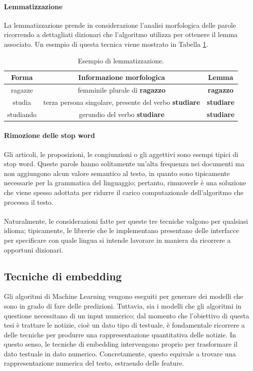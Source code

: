 \documentclass[12pt]{report}
\theoremstyle{definition}
\begin{document}
\paragraph{Lemmatizzazione} La lemmatizzazione prende in considerazione l'analisi morfologica delle parole ricorrendo a dettagliati dizionari che l'algoritmo utilizza per ottenere il lemma associato.
Un esempio di questa tecnica viene mostrato in Tabella \ref{lemmatization}.
\begin{table}[!h]
\centering
 \begin{tabular}{|c|c|c|} 
 \hline 
 \textbf{Forma} & \textbf{Informazione morfologica} & \textbf{Lemma}
\\ [0.5ex] 
\hline
ragazze & femminile plurale di \textbf{ragazzo} & \textbf{ragazzo} \\
studia & terza persona singolare, presente del verbo \textbf{studiare} & \textbf{studiare} \\
studiando & gerundio del verbo \textbf{studiare} & \textbf{studiare} \\
 \hline
\end{tabular}
\caption{Esempio di lemmatizzazione.}
\label{lemmatization}
\end{table}

\paragraph{Rimozione delle stop word}
Gli articoli, le proposizioni, le congiunzioni o gli aggettivi sono esempi tipici di stop word. Queste parole hanno solitamente un'alta frequenza nei documenti ma non aggiungono alcun valore semantico al testo, in quanto sono tipicamente necessarie per la grammatica del linguaggio; pertanto, rimuoverle è una soluzione che viene spesso adottata per ridurre il carico computazionale dell'algoritmo che processa il testo.
\\
\\
Naturalmente, le considerazioni fatte per queste tre tecniche valgono per qualsiasi idioma; tipicamente, le librerie che le implementano presentano delle interfacce per specificare con quale lingua si intende lavorare in maniera da ricorrere a opportuni dizionari.

\subsection{Tecniche di embedding} \label{embedding}
Gli algoritmi di Machine Learning vengono eseguiti per generare dei modelli che sono in grado di fare delle predizioni. Tuttavia, sia i modelli che gli algoritmi in questione necessitano di un input numerico; dal momento che l'obiettivo di questa tesi è trattare le notizie, cioè un dato tipo di testuale, è fondamentale ricorrere a delle tecniche per produrre una rappresentazione quantitativa delle notizie.
In questo senso, le tecniche di embedding intervengono proprio per trasformare il dato testuale in dato numerico.
Concretamente, questo equivale a trovare una rappresentazione numerica del testo, estraendo delle feature.
\end{document}
